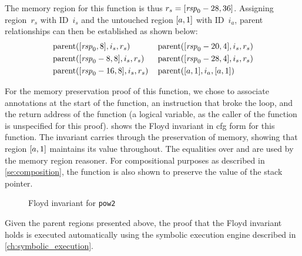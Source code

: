 The memory region for this function is thus $r_s=[\mathit{rsp}_0-28,36]$.
Assigning region~$r_s$ with ID~$i_s$
and the untouched region $[a,1]$ with ID~$i_a$,
parent relationships can then be established as shown below:
\begin{align*}
  & \operatorname{parent}([\mathit{rsp}_0,8],i_s,r_s) && \operatorname{parent}([\mathit{rsp}_0-20,4],i_s,r_s) \\
  & \operatorname{parent}([\mathit{rsp}_0-8,8],i_s,r_s) && \operatorname{parent}([\mathit{rsp}_0-28,4],i_s,r_s) \\
  & \operatorname{parent}([\mathit{rsp}_0-16,8],i_s,r_s) && \operatorname{parent}([a,1],i_a,[a,1])
\end{align*}

For the memory preservation proof of this function, we chose to associate annotations
at the start of the function, an instruction that broke the loop,
and the return address of the function
(a logical variable, as the caller of the function is unspecified for this proof).
 shows the Floyd invariant in \ac{cfg} form for this function.
The invariant carries through the preservation of memory,
showing that region $[a,1]$ maintains its value throughout.
The equalities over  and 
are used by the memory region reasoner.
For compositional purposes as described in \cref{se:composition},
the function is also shown to preserve the value of the stack pointer.
\begin{figure}
  \centering
  \caption{Floyd invariant for \texttt{pow2}}\label{fig:pow2cfg}
\end{figure}
Given the parent regions presented above, the proof that the Floyd invariant holds
is executed automatically using the symbolic execution engine
described in \cref{ch:symbolic_execution}.

